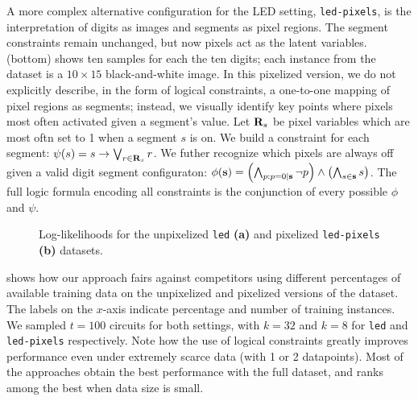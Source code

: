 A more complex alternative configuration for the LED setting, \texttt{led-pixels}, is the
interpretation of digits as images and segments as pixel regions. The segment constraints remain
unchanged, but now pixels act as the latent variables.  (bottom) shows ten samples
for each the ten digits; each instance from the dataset is a $10\times 15$ black-and-white image.
In this pixelized version, we do not explicitly describe, in the form of logical constraints, a
one-to-one mapping of pixel regions as segments; instead, we visually identify key points where
pixels most often activated given a segment's value. Let $\mathbf{R}_s$ be pixel variables which are
most oftn set to 1 when a segment $s$ is on. We build a constraint for each segment: $\psi(s)=s\to
\bigvee_{r\in\mathbf{R}_s} r$. We futher recognize which pixels are always off given a valid digit
segment configuraton: $\phi(\mathbf{s})=\left(\bigwedge_{p:p=0|\mathbf{s}} \neg p\right)\wedge\left(
\bigwedge_{s\in\mathbf{s}} s\right)$. The full logic formula encoding all constraints is the
conjunction of every possible $\phi$ and $\psi$.


\begin{figure}[t]
  \begin{subfigure}{0.495\textwidth}
    \caption{}
    \label{fig:ll-led}
  \end{subfigure}
  \begin{subfigure}{0.495\textwidth}
    \caption{}
    \label{fig:ll-led-pixels}
  \end{subfigure}
  \caption{Log-likelihoods for the unpixelized \texttt{led} \textbf{(a)} and pixelized
    \texttt{led-pixels} \textbf{(b)} datasets.}
  \label{fig:ll-led-all}
\end{figure}

 shows how our approach fairs against competitors using different percentages
of available training data on the unpixelized and pixelized versions of the dataset. The labels on
the $x$-axis indicate percentage and number of training instances. We sampled $t=100$ circuits for
both settings, with $k=32$ and $k=8$ for \texttt{led} and \texttt{led-pixels} respectively. Note
how the use of logical constraints greatly improves performance even under extremely scarce data
(with 1 or 2 datapoints). Most of the  approaches obtain the best performance
with the full dataset, and ranks among the best when data size is small.

